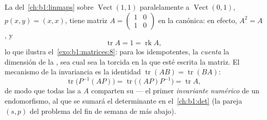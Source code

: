 \begin{example}
\label{ex:b1:matrices:tracework}
La  del~\cref{ch:b1:linmaps} sobre
$\operatorname{Vect}(1,1)$ paralelamente a
$\operatorname{Vect}(0,1)$, $p(x, y) = (x, x)$, tiene matriz
$A = \begin{pmatrix} 1 & 0\\ 1 & 0\end{pmatrix}$ en la 
canónica: en efecto, $A^2 = A$, y
\[
\operatorname{tr} A = 1 = \operatorname{rk} A ,
\]
lo que ilustra el~\cref{exo:b1:matrices:8}: para los idempotentes, la
 \emph{cuenta} la dimensión de la , sea cual sea la
 torcida en la que esté escrita la matriz. El mecanismo de la
invariancia es la identidad
$\operatorname{tr}(AB) = \operatorname{tr}(BA)$:
\[
\operatorname{tr}\bigl(P^{-1}(AP)\bigr) =
\operatorname{tr}\bigl((AP)P^{-1}\bigr) = \operatorname{tr} A ,
\]
de modo que todas las  a $A$ comparten su
 --- el primer \emph{invariante numérico} de un endomorfismo,
al que se sumará el determinante en el~\cref{ch:b1:det} (la pareja
$(s, p)$ del problema del fin de semana de más abajo).
\end{example}

